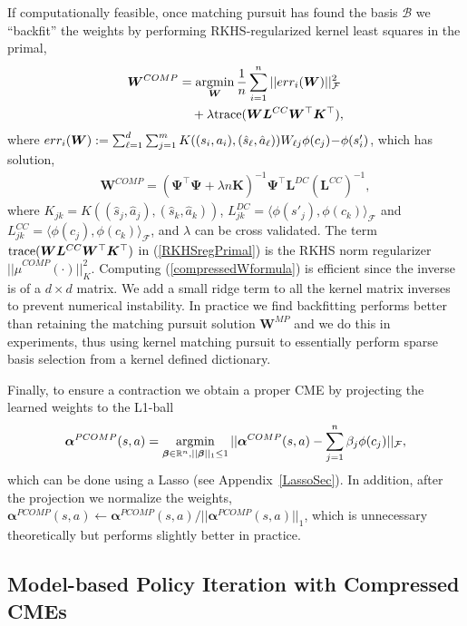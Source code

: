 \documentclass[letterpaper]{article}
\newcommand{\cB}{{\mathcal B}}
\newcommand{\cF}{{\mathcal F}}
\newcommand{\balpha}{{\bm \alpha}}
\newcommand{\bbeta}{{\bm \beta}}
\newcommand{\bL}{{\bm L}}
\newcommand{\bK}{{\bm K}}
\newcommand{\bW}{{\bm W}}
\newcommand{\bPsi}{{\bm \Psi}}
\newcommand{\R}{{\mathbb R}}
\newcommand{\argmin}{\operatornamewithlimits{argmin}}
\newcommand{\lang}{\langle}
\newcommand{\rang}{\rangle}
\newcommand{\nn}{\nonumber}
\begin{document}
If computationally feasible, once matching pursuit has found the basis $\cB$ we ``backfit'' the weights by performing RKHS-regularized kernel least squares in the primal,
\begin{align}
\bW^{COMP}&= \argmin_{\bW} \frac{1}{n}\sum_{i=1}^n ||err_i(\bW) ||^2_\cF \nn\\
&\quad+ \lambda {\rm trace}(\bW\bL^{CC}\bW^\top\bK^\top), \label{RKHSregPrimal}
\end{align}
where $err_i(\bW)  := \sum_{\ell=1}^d\sum_{j=1}^m K((s_i,a_i),(\hat s_\ell,\hat a_\ell)) W_{\ell j}\phi(c_j)\hspace{-0.7mm} -\hspace{-0.7mm} \phi(s'_i)$, which has solution,
\begin{align}
\bW^{COMP} = (\bPsi^\top \bPsi + \lambda n\bK)^{-1}\bPsi^\top\bL^{DC}(\bL^{CC})^{-1}, \label{compressedWformula}
\end{align}
where $K_{jk} = K((\hat s_j,\hat a_j),(\hat s_k,\hat a_k))$, $L_{jk}^{DC} = \lang \phi(s'_j) , \phi(c_k) \rang_{\cF}$ and $L_{jk}^{CC} = \lang \phi(c_j) , \phi(c_k) \rang_{\cF}$, and $\lambda$ can be cross validated. The term ${\rm trace}(\bW\bL^{CC}\bW^\top\bK^\top)$ in (\ref{RKHSregPrimal}) is the RKHS norm regularizer $||\hat\mu^{COMP}(\cdot)||_K^2$. Computing (\ref{compressedWformula}) is efficient since the inverse is of a $d\times d$ matrix. We add a small ridge term to all the kernel matrix inverses to prevent numerical instability. In practice we find backfitting performs better than retaining the matching pursuit solution $\bW^{MP}$ and we do this in experiments, thus using kernel matching pursuit to essentially perform sparse basis selection from a kernel defined dictionary. 

Finally, to ensure a contraction we obtain a proper CME by projecting the learned weights to the L1-ball
\begin{align}
\balpha^{PCOMP}(s,a) = \argmin_{\bbeta \in \R^n, ||\bbeta||_1\le 1} || \balpha^{COMP}(s,a) - \sum_{j=1}^n \beta_j  \phi(c_j)  ||_{\cF},\label{CompProjAlpha}
\end{align}
which can be done using a Lasso (see Appendix~\ref{LassoSec}). In addition, after the projection we normalize the weights, $\balpha^{PCOMP}(s,a) \leftarrow \balpha^{PCOMP}(s,a)/||\balpha^{PCOMP}(s,a)||_1$, which is unnecessary theoretically but performs slightly better in practice.


\subsection{Model-based Policy Iteration with Compressed CMEs}
\end{document}
